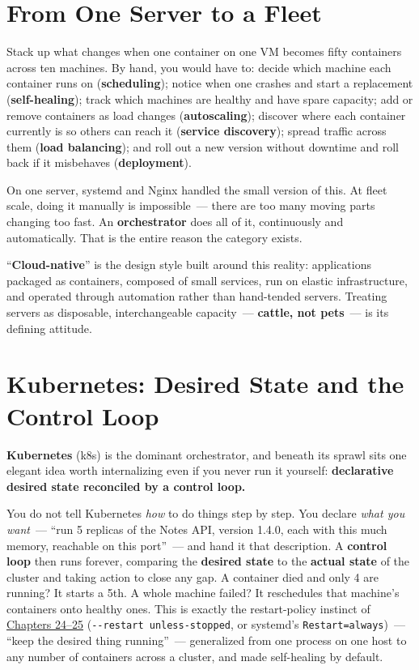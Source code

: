 \setcounter{section}{0}
\section{From One Server to a Fleet}\label{43-cloud-native-orchestration:431-from-one-server-to-a-fleet}

Stack up what changes when one container on one VM becomes fifty containers across ten machines. By hand, you would have to: decide which machine each container runs on (\textbf{scheduling}); notice when one crashes and start a replacement (\textbf{self-healing}); track which machines are healthy and have spare capacity; add or remove containers as load changes (\textbf{autoscaling}); discover where each container currently is so others can reach it (\textbf{service discovery}); spread traffic across them (\textbf{load balancing}); and roll out a new version without downtime and roll back if it misbehaves (\textbf{deployment}).

On one server, systemd and Nginx handled the small version of this. At fleet scale, doing it manually is impossible~--- there are too many moving parts changing too fast. An \textbf{orchestrator} does all of it, continuously and automatically. That is the entire reason the category exists.

``\textbf{Cloud-native}'' is the design style built around this reality: applications packaged as containers, composed of small services, run on elastic infrastructure, and operated through automation rather than hand-tended servers. Treating servers as disposable, interchangeable capacity~--- \textbf{cattle, not pets}~--- is its defining attitude.

\setcounter{section}{1}
\section{Kubernetes: Desired State and the Control Loop}\label{43-cloud-native-orchestration:432-kubernetes-desired-state-and-the-control-loop}

\textbf{Kubernetes} (k8s) is the dominant orchestrator, and beneath its sprawl sits one elegant idea worth internalizing even if you never run it yourself: \textbf{declarative desired state reconciled by a control loop.}

You do not tell Kubernetes \emph{how} to do things step by step. You declare \emph{what you want}~--- ``run 5 replicas of the Notes API, version 1.4.0, each with this much memory, reachable on this port''~--- and hand it that description. A \textbf{control loop} then runs forever, comparing the \textbf{desired state} to the \textbf{actual state} of the cluster and taking action to close any gap. A container died and only 4 are running? It starts a 5th. A whole machine failed? It reschedules that machine's containers onto healthy ones. This is exactly the restart-policy instinct of \hyperref[ch:24-process-startup]{Chapters 24--25} (\texttt{-}\allowbreak{}\texttt{-}\allowbreak{}\texttt{restart\ unless-}\allowbreak{}\texttt{stopped}, or systemd's \texttt{Restart=always})~--- ``keep the desired thing running''~--- generalized from one process on one host to any number of containers across a cluster, and made self-healing by default.

